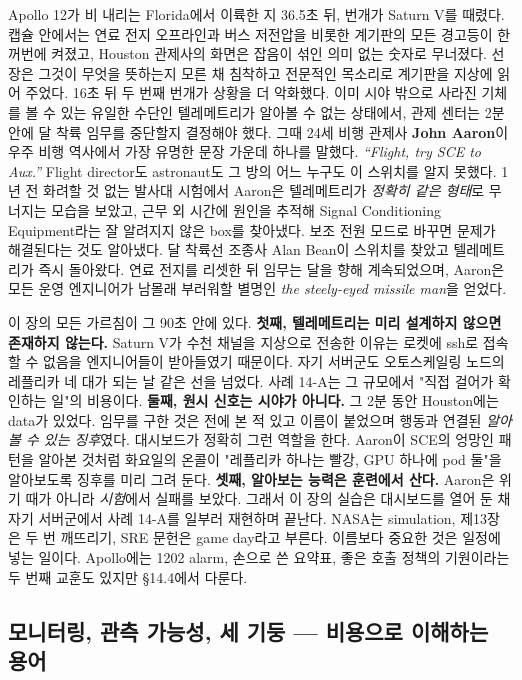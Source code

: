 Apollo 12가 비 내리는 Florida에서 이륙한 지 36.5초 뒤, 번개가 Saturn V를 때렸다. 캡슐 안에서는 연료 전지 오프라인과 버스 저전압을 비롯한 계기판의 모든 경고등이 한꺼번에 켜졌고, Houston 관제사의 화면은 잡음이 섞인 의미 없는 숫자로 무너졌다. 선장은 그것이 무엇을 뜻하는지 모른 채 침착하고 전문적인 목소리로 계기판을 지상에 읽어 주었다. 16초 뒤 두 번째 번개가 상황을 더 악화했다. 이미 시야 밖으로 사라진 기체를 볼 수 있는 유일한 수단인 텔레메트리가 알아볼 수 없는 상태에서, 관제 센터는 2분 안에 달 착륙 임무를 중단할지 결정해야 했다. 그때 24세 비행 관제사 \textbf{John Aaron}이 우주 비행 역사에서 가장 유명한 문장 가운데 하나를 말했다. \textit{“Flight, try SCE to Aux.”} Flight director도 astronaut도 그 방의 어느 누구도 이 스위치를 알지 못했다. 1년 전 화려할 것 없는 발사대 시험에서 Aaron은 텔레메트리가 \textit{정확히 같은 형태}로 무너지는 모습을 보았고, 근무 외 시간에 원인을 추적해 Signal Conditioning Equipment라는 잘 알려지지 않은 box를 찾아냈다. 보조 전원 모드로 바꾸면 문제가 해결된다는 것도 알아냈다. 달 착륙선 조종사 Alan Bean이 스위치를 찾았고 텔레메트리가 즉시 돌아왔다. 연료 전지를 리셋한 뒤 임무는 달을 향해 계속되었으며, Aaron은 모든 운영 엔지니어가 남몰래 부러워할 별명인 \textit{the steely-eyed missile man}을 얻었다.

이 장의 모든 가르침이 그 90초 안에 있다. \textbf{첫째, 텔레메트리는 미리 설계하지 않으면 존재하지 않는다.} Saturn V가 수천 채널을 지상으로 전송한 이유는 로켓에 ssh로 접속할 수 없음을 엔지니어들이 받아들였기 때문이다. 자기 서버군도 오토스케일링 노드의 레플리카 네 대가 되는 날 같은 선을 넘었다. 사례 14-A는 그 규모에서 "직접 걸어가 확인하는 일"의 비용이다. \textbf{둘째, 원시 신호는 시야가 아니다.} 그 2분 동안 Houston에는 data가 있었다. 임무를 구한 것은 전에 본 적 있고 이름이 붙었으며 행동과 연결된 \textit{알아볼 수 있는 징후}였다. 대시보드가 정확히 그런 역할을 한다. Aaron이 SCE의 엉망인 패턴을 알아본 것처럼 화요일의 온콜이 "레플리카 하나는 빨강, GPU 하나에 pod 둘"을 알아보도록 징후를 미리 그려 둔다. \textbf{셋째, 알아보는 능력은 훈련에서 산다.} Aaron은 위기 때가 아니라 \textit{시험}에서 실패를 보았다. 그래서 이 장의 실습은 대시보드를 열어 둔 채 자기 서버군에서 사례 14-A를 일부러 재현하며 끝난다. NASA는 simulation, 제13장은 두 번 깨뜨리기, SRE 문헌은 game day라고 부른다. 이름보다 중요한 것은 일정에 넣는 일이다. Apollo에는 1202 alarm, 손으로 쓴 요약표, 좋은 호출 정책의 기원이라는 두 번째 교훈도 있지만 §14.4에서 다룬다.

\subsection*{모니터링, 관측 가능성, 세 기둥 — 비용으로 이해하는 용어}

